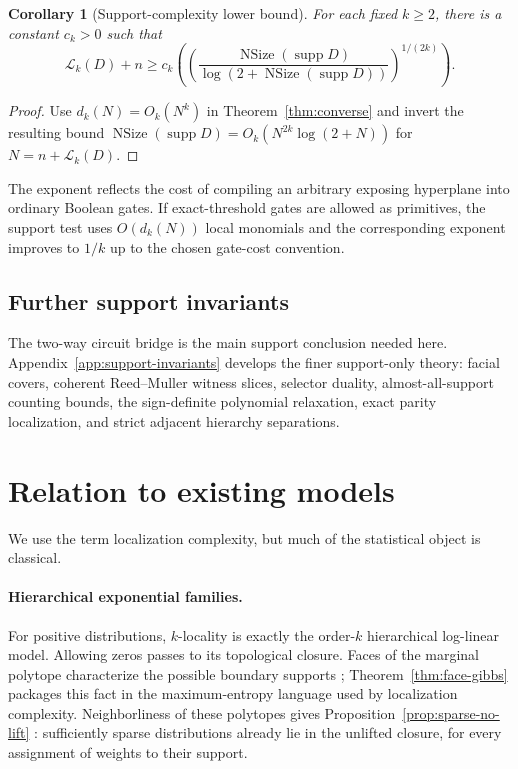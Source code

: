 \documentclass{article}
\newcommand{\LC}{\mathcal{L}}
\newcommand{\supp}{\operatorname{supp}}
\newcommand{\NSize}{\operatorname{NSize}}
\newtheorem{corollary}{Corollary}
\begin{document}
\begin{corollary}[Support-complexity lower bound]\label{cor:lower-bound}
For each fixed $k\ge2$, there is a constant $c_k>0$ such that
\[
  \LC_k(D)+n
  \ge c_k\!\left(
    \left(\frac{\NSize(\supp D)}{\log(2+\NSize(\supp D))}\right)^{1/(2k)}
  \right).
\]
\end{corollary}

\begin{proof}
Use $d_k(N)=O_k(N^k)$ in Theorem~\ref{thm:converse} and invert the resulting
bound
$\NSize(\supp D)=O_k(N^{2k}\log(2+N))$ for $N=n+\LC_k(D)$.
\end{proof}

The exponent reflects the cost of compiling an arbitrary exposing hyperplane
into ordinary Boolean gates.  If exact-threshold gates are allowed as
primitives, the support test uses $O(d_k(N))$ local monomials and the
corresponding exponent improves to $1/k$ up to the chosen gate-cost convention.

\subsection{Further support invariants}

The two-way circuit bridge is the main support conclusion needed here.
Appendix~\ref{app:support-invariants} develops the finer support-only theory:
facial covers, coherent Reed--Muller witness slices, selector duality,
almost-all-support counting bounds, the sign-definite polynomial relaxation,
exact parity localization, and strict adjacent hierarchy separations.

\section{Relation to existing models}\label{sec:related}

We use the term localization complexity, but much of the statistical object is
classical.

\paragraph{Hierarchical exponential families.}
For positive distributions, $k$-locality is exactly the order-$k$ hierarchical
log-linear model.  Allowing zeros passes to its topological closure.  Faces of
the marginal polytope characterize the possible boundary supports
\cite{rauh11,malago11}; Theorem~\ref{thm:face-gibbs} packages this fact in the
maximum-entropy language used by localization complexity.  Neighborliness of
these polytopes gives Proposition~\ref{prop:sparse-no-lift}
\cite{kahle10}: sufficiently sparse distributions already lie in the
unlifted closure, for every assignment of weights to their support.
\end{document}
